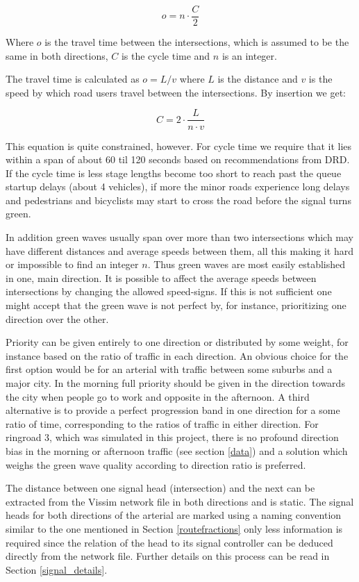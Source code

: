 $$o = n \cdot \frac{C}{2}$$

Where $o$ is the travel time between the intersections, which is assumed to be the same in both directions, $C$ is the cycle time and $n$ is an integer.

The travel time is calculated as $o = L / v$ where $L$ is the distance and $v$ is the speed by which road users travel between the intersections. By insertion we get:

$$C = 2 \cdot \frac{L}{n \cdot v}$$

This equation is quite constrained, however. For cycle time we require that it lies within a span of about 60 til 120 seconds based on recommendations from DRD. If the cycle time is less stage lengths become too short to reach past the queue startup delays (about 4 vehicles), if more the minor roads experience long delays and pedestrians and bicyclists may start to cross the road before the signal turns green.

In addition green waves usually span over more than two intersections which may have different distances and average speeds between them, all this making it hard or impossible to find an integer $n$. Thus green waves are most easily established in one, main direction. It is possible to affect the average speeds between intersections by changing the allowed speed-signs. If this is not sufficient one might accept that the green wave is not perfect by, for instance, prioritizing one direction over the other.

Priority can be given entirely to one direction or distributed by some weight, for instance based on the ratio of traffic in each direction. An obvious choice for the first option would be for an arterial with traffic between some suburbs and a major city. In the morning full priority should be given in the direction towards the city when people go to work and opposite in the afternoon. A third alternative is to provide a perfect progression band in one direction for a some ratio of time, corresponding to the ratios of traffic in either direction.
For ringroad 3, which was simulated in this project, there is no profound direction bias in the morning or afternoon traffic (see section \ref{data}) and a solution which weighs the green wave quality according to direction ratio is preferred. 

The distance between one signal head (intersection) and the next can be extracted from the Vissim network file in both directions and is static. The signal heads for both directions of the arterial are marked using a naming convention similar to the one mentioned in Section \ref{routefractions} only less information is required since the relation of the head to its signal controller can be deduced directly from the network file. Further details on this process can be read in Section \ref{signal_details}.

